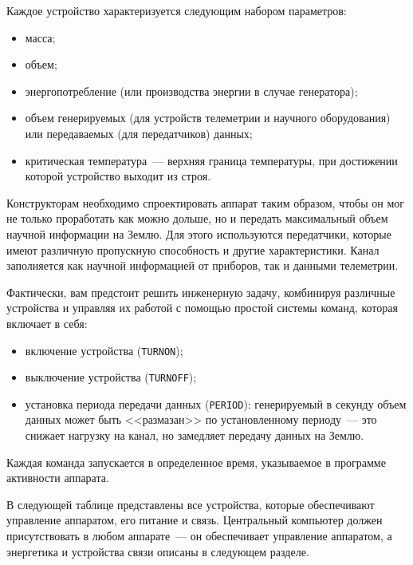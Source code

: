 \documentclass[12pt,a4paper]{article}
\begin{document}
Каждое устройство характеризуется следующим набором параметров:

\begin{itemize}
\item масса;
\item объем;
\item энергопотребление (или производства энергии в случае генератора);
\item объем генерируемых (для устройств телеметрии и научного оборудования) или передаваемых (для передатчиков) данных;
\item критическая температура~--- верхняя граница температуры, при достижении которой устройство выходит из строя.
\end{itemize}

Конструкторам необходимо спроектировать аппарат таким образом, чтобы он мог не только
проработать как можно дольше, но и передать максимальный объем научной информации на
Землю. Для этого используются передатчики, которые имеют различную пропускную способность
и другие характеристики. Канал заполняется как научной информацией от приборов, так и
данными телеметрии.

Фактически, вам предстоит решить инженерную задачу, комбинируя различные устройства и
управляя их работой с помощью простой системы команд, которая включает в себя:

\begin{itemize}
\item включение устройства (\verb'TURNON');
\item выключение устройства (\verb'TURNOFF');
\item установка периода передачи данных (\verb'PERIOD'): генерируемый в секунду объем данных
  может быть <<размазан>> по установленному периоду~--- это снижает нагрузку на канал, но
  замедляет передачу данных на Землю.
\end{itemize}
  
Каждая команда запускается в определенное время, указываемое в программе активности
аппарата.

В следующей таблице представлены все устройства, которые обеспечивают управление
аппаратом, его питание и связь. Центральный компьютер должен присутствовать в любом
аппарате~--- он обеспечивает управление аппаратом, а энергетика и устройства связи описаны
в следующем разделе.
\end{document}
